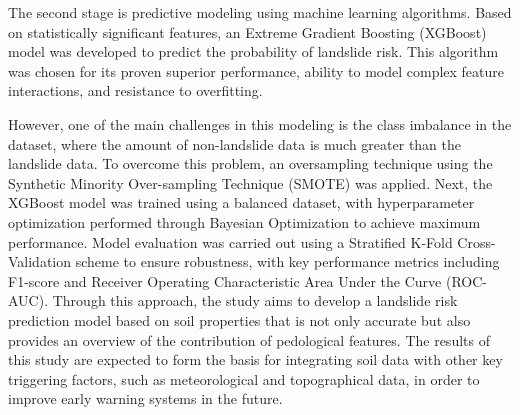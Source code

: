 The second stage is predictive modeling using machine learning algorithms. 
Based on statistically significant features, an Extreme Gradient Boosting (XGBoost) model was developed to predict the probability of landslide risk. This algorithm was chosen for its proven superior performance, ability to model complex feature interactions, and resistance to overfitting.

However, one of the main challenges in this modeling is the class imbalance in the dataset, where the amount of non-landslide data is much greater than the landslide data. To overcome this problem, an oversampling technique using the Synthetic Minority Over-sampling Technique (SMOTE) was applied. 
Next, the XGBoost model was trained using a balanced dataset, with hyperparameter optimization performed through Bayesian Optimization to achieve maximum performance. Model evaluation was carried out using a Stratified K-Fold Cross-Validation scheme to ensure robustness, with key performance metrics including F1-score and Receiver Operating Characteristic Area Under the Curve (ROC-AUC).
Through this approach, the study aims to develop a landslide risk prediction model based on soil properties that is not only accurate but also provides an overview of the contribution of pedological features. The results of this study are expected to form the basis for integrating soil data with other key triggering factors, such as meteorological and topographical data, in order to improve early warning systems in the future.
